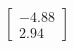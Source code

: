 \documentclass[preview]{standalone}
\begin{document}
\begin{align*}
\begin{bmatrix} -4.88 \\ 2.94 \end{bmatrix}
\end{align*}
\end{document}
